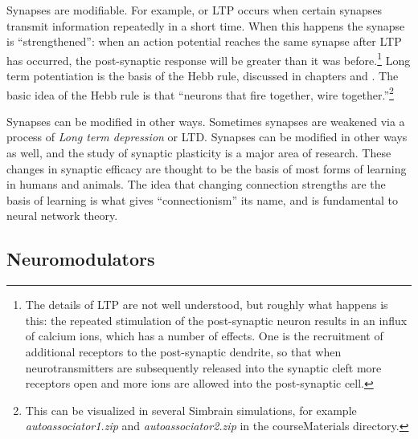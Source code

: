 Synapses are modifiable. For example,   or LTP occurs when certain synapses transmit information repeatedly in a short time. When this happens the synapse is ``strengthened'': when an action potential reaches the same synapse after LTP has occurred, the post-synaptic response will be greater than it was before.\footnote{The details of LTP are not well understood, but roughly what happens is this: the repeated stimulation of the post-synaptic neuron results in an influx of calcium ions, which has a number of effects. One is the recruitment of additional receptors to the post-synaptic dendrite, so that when neurotransmitters are subsequently released into the synaptic cleft more receptors open and more ions are allowed into the post-synaptic cell.}   Long term potentiation is the basis of the Hebb rule, discussed in chapters  and . The basic idea of the Hebb rule is that ``neurons that fire together, wire together.''\footnote{This can be visualized in several Simbrain simulations, for example \emph{autoassociator1.zip} and \emph{autoassociator2.zip} in the courseMaterials directory.}   

Synapses can be modified in other ways. Sometimes synapses are weakened via a process of \emph{Long term depression} or LTD. Synapses can be modified in other ways as well, and the study of synaptic plasticity is a major area of research. These changes in synaptic efficacy are thought to be the basis of most forms of learning in humans and animals. The idea that changing connection strengths are the basis of learning is what gives ``connectionism'' its name, and is fundamental to neural network theory.

\subsection{Neuromodulators}\label{neuroModulator}


